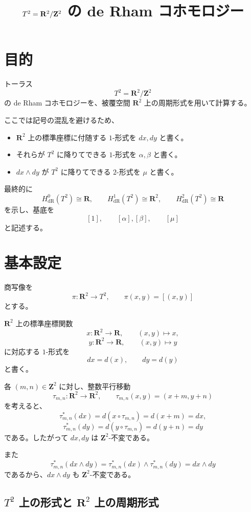 \documentclass[uplatex,dvipdfmx,11pt]{jsarticle}
\title{$T^2=\R^2/\Z^2$ の de Rham コホモロジー}
\author{}
\date{}
\newcommand{\R}{\mathbf{R}}
\newcommand{\Z}{\mathbf{Z}}
\theoremstyle{definition}
\begin{document}
\maketitle

\section{目的}

トーラス
\[
T^2=\R^2/\Z^2
\]
の de Rham コホモロジーを、被覆空間 \(\R^2\) 上の周期形式を用いて計算する。

ここでは記号の混乱を避けるため、
\begin{itemize}
  \item \(\R^2\) 上の標準座標に付随する $1$-形式を \(dx,dy\) と書く。
  \item それらが \(T^2\) に降りてできる $1$-形式を \(\alpha,\beta\) と書く。
  \item \(dx\wedge dy\) が \(T^2\) に降りてできる $2$-形式を \(\mu\) と書く。
\end{itemize}

最終的に
\[
H^0_{\mathrm{dR}}(T^2)\cong \R,\qquad
H^1_{\mathrm{dR}}(T^2)\cong \R^2,\qquad
H^2_{\mathrm{dR}}(T^2)\cong \R
\]
を示し、基底を
\[
[1],\qquad [\alpha],[\beta],\qquad [\mu]
\]
と記述する。

\section{基本設定}

商写像を
\[
\pi:\R^2\to T^2,\qquad \pi(x,y)=[(x,y)]
\]
とする。

\(\R^2\) 上の標準座標関数
\[
x:\R^2\to\R,\qquad (x,y)\mapsto x,
\]
\[
y:\R^2\to\R,\qquad (x,y)\mapsto y
\]
に対応する $1$-形式を
\[
dx=d(x),\qquad dy=d(y)
\]
と書く。

各 \((m,n)\in\Z^2\) に対し、整数平行移動
\[
\tau_{m,n}:\R^2\to\R^2,\qquad \tau_{m,n}(x,y)=(x+m,y+n)
\]
を考えると、
\[
\tau_{m,n}^*(dx)=d(x\circ \tau_{m,n})=d(x+m)=dx,
\]
\[
\tau_{m,n}^*(dy)=d(y\circ \tau_{m,n})=d(y+n)=dy
\]
である。したがって \(dx,dy\) は \(\Z^2\)-不変である。

また
\[
\tau_{m,n}^*(dx\wedge dy)=\tau_{m,n}^*(dx)\wedge \tau_{m,n}^*(dy)=dx\wedge dy
\]
であるから、\(dx\wedge dy\) も \(\Z^2\)-不変である。

\subsection{\(T^2\) 上の形式と \(\R^2\) 上の周期形式}
\end{document}
